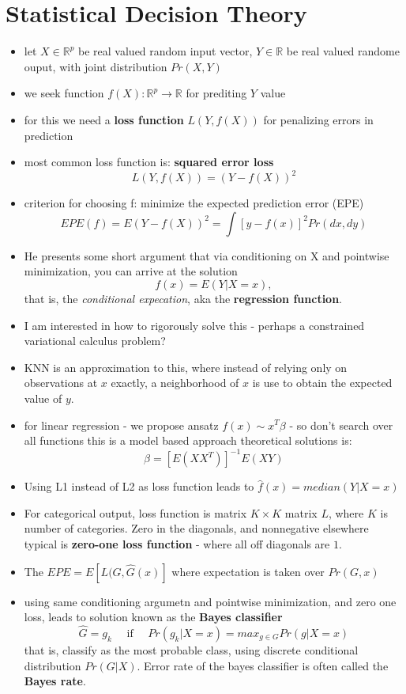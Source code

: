 \documentclass[a4paper]{report}
\def\reals{\mathbb{R}}
\begin{document}
\section{Statistical Decision Theory}
\begin{itemize}
  \item let $X \in \reals^p$ be real valued random input vector, $Y \in \reals$ be real valued randome ouput, with joint distribution $Pr(X,Y)$
  \item we seek function $f(X):\reals^p \to \reals$ for prediting $Y$ value
  \item for this we need a {\bf loss function} $L(Y, f(X))$ for penalizing errors in prediction
  \item most common loss function is: {\bf squared error loss} 
    $$ L(Y, f(X)) = (Y - f(X))^2 $$
  \item criterion for choosing f: minimize the expected prediction error (EPE)
    $$ EPE(f) = E(Y-f(X))^2 = \int [y - f(x)]^2 Pr(dx,dy) $$
  \item He presents some short argument that via conditioning on X and pointwise minimization, you can arrive at the solution
    $$ f(x) = E(Y | X = x), $$
    that is, the \emph{conditional expecation}, aka the {\bf regression function}.
  \item {\color{gray} I am interested in how to rigorously solve this - perhaps a constrained variational calculus problem?}
  \item KNN is an approximation to this, where instead of relying only on observations at $x$ exactly, a neighborhood of $x$ is use to obtain the expected value of $y$.
  \item for linear regression - we propose ansatz $f(x) \sim x^T \beta$ -  so don't search over all functions
    \subitem this is a model based approach
    \subitem theoretical solutions is:
    $$ \beta = \left[ E(XX^T)\right]^{-1} E(XY) $$
  \item Using L1 instead of L2 as loss function leads to $ \hat{f}(x) = median(Y| X = x)$
  \item For categorical output, loss function is matrix $K\times K$ matrix $L$, where $K$ is number of categories. Zero in the diagonals, and nonnegative elsewhere
    \subitem typical is {\bf zero-one loss function} - where all off diagonals are $1$.
  \item The $EPE = E[L(G, \hat{G}(x)]$ where expectation is taken over $Pr(G, x)$
    \item using same conditioning argumetn and pointwise minimization, and zero one loss, leads to solution known as the {\bf Bayes classifier}
      $$ \hat{G} = g_k \quad \mbox{ if } \quad Pr(g_k | X = x) = max_{g \in G} Pr(g | X = x) $$
      that is, classify as the most probable class, using discrete conditional distribution $Pr(G|X)$.
      \subitem Error rate of the bayes classifier is often called the {\bf Bayes rate}.
\end{itemize}
\end{document}
